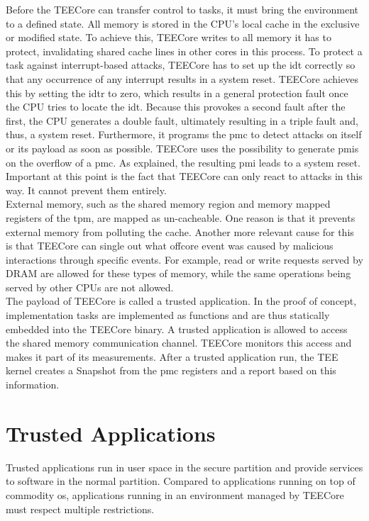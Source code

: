 Before the TEECore can transfer control to tasks, it must bring the environment
to a defined state. All memory is stored in the CPU's local cache in the
exclusive or modified state. To achieve this, TEECore writes to all memory it
has to protect, invalidating shared cache lines in other cores in this process.
To protect a task against interrupt-based attacks, TEECore has to set up the
\gls{idt} correctly so that any occurrence of any interrupt results in a system
reset. TEECore achieves this by setting the \gls{idtr} to zero, which results in
a general protection fault once the CPU tries to locate the \gls{idt}. Because
this provokes a second fault after the first, the CPU generates a double fault,
ultimately resulting in a triple fault and, thus, a system reset. Furthermore,
it programs the \gls{pmc} to detect attacks on itself or its payload as soon as
possible. TEECore uses the possibility to generate \glspl{pmi} on the overflow
of a \gls{pmc}. As explained, the resulting \gls{pmi} leads to a system reset.
Important at this point is the fact that TEECore can only react to attacks in
this way. It cannot prevent them entirely.\\

External memory, such as the shared memory region and memory mapped registers of
the \gls{tpm}, are mapped as un-cacheable. One reason is that it prevents
external memory from polluting the cache. Another more relevant cause for this
is that TEECore can single out what offcore event was caused by malicious
interactions through specific events. For example, read or write requests served
by DRAM are allowed for these types of memory, while the same operations being
served by other CPUs are not allowed.\\

The payload of TEECore is called a trusted application. In the proof of concept,
implementation tasks are implemented as functions and are thus statically
embedded into the TEECore binary. A trusted application is allowed to access the
shared memory communication channel. TEECore monitors this access and makes it
part of its measurements. After a trusted application run, the TEE kernel
creates a Snapshot from the \gls{pmc} registers and a report based on this
information.

\section{Trusted Applications}
\label{sec:30:tee_apps}
Trusted applications run in user space in the secure partition and provide
services to software in the normal partition. Compared to applications running
on top of commodity \gls{os}, applications running in an environment managed by
TEECore must respect multiple restrictions.\\

